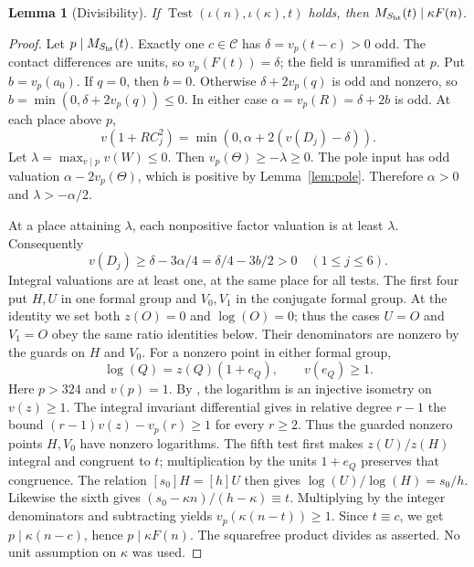 \documentclass[11pt]{article}
\newtheorem{lemma}[theorem]{Lemma}
\theoremstyle{definition}
\theoremstyle{remark}
\newcommand{\Cset}{\mathcal C}
\newcommand{\Test}{\operatorname{Test}}
\begin{document}
\begin{lemma}[Divisibility]\label{lem:test}
If $\Test(\iota(n),\iota(\kappa),t)$ holds, then
$M_{S_{\rm ht}}(t)\mid\kappa F(n)$.
\end{lemma}
\begin{proof}
Let $p\mid M_{S_{\rm ht}}(t)$. Exactly one $c\in\Cset$ has
$\delta=v_p(t-c)>0$ odd. The contact differences are units, so
$v_p(F(t))=\delta$; the field is unramified at $p$. Put $b=v_p(a_0)$.
If $q=0$, then $b=0$. Otherwise $\delta+2v_p(q)$ is odd and
nonzero, so $b=\min(0,\delta+2v_p(q))\le0$. In either case
$\alpha=v_p(R)=\delta+2b$ is odd. At each place above $p$,
\[
 v(1+RC_j^2)=\min(0,\alpha+2(v(D_j)-\delta)).
\]
Let $\lambda=\max_{v\mid p}v(W)\le0$. Then
$v_p(\Theta)\ge-\lambda\ge0$. The pole input has odd valuation
$\alpha-2v_p(\Theta)$, which is positive by Lemma~\ref{lem:pole}.
Therefore $\alpha>0$ and $\lambda> -\alpha/2$.

At a place attaining $\lambda$, each nonpositive factor valuation is
at least $\lambda$. Consequently
\[
 v(D_j)\ge\delta-3\alpha/4=\delta/4-3b/2>0
 \quad(1\le j\le6).
\]
Integral valuations are at least one, at the same place for all tests.
The first four put $H,U$ in one formal group and $V_0,V_1$ in the
conjugate formal group. At the identity we set both $z(O)=0$ and
$\log(O)=0$; thus the cases $U=O$ and $V_1=O$ obey the same ratio
identities below. Their denominators are nonzero by the guards on
$H$ and $V_0$. For a nonzero point in either formal group,
\[
 \log(Q)=z(Q)(1+e_Q),\qquad v(e_Q)\ge1.
\]
Here $p>324$ and $v(p)=1$. By
\cite[IV.5.5 and IV.6.4, pp.~129--132]{silverman},
the logarithm is an injective isometry on $v(z)\ge1$.
The integral invariant differential gives in relative degree $r-1$
the bound $(r-1)v(z)-v_p(r)\ge1$ for every $r\ge2$.
Thus the guarded nonzero points $H,V_0$ have nonzero logarithms.
The fifth test first makes $z(U)/z(H)$ integral and congruent to
$t$; multiplication by the units $1+e_Q$ preserves that congruence.
The relation $[s_0]H=[h]U$ then gives
$\log(U)/\log(H)=s_0/h$. Likewise the sixth gives
$(s_0-\kappa n)/(h-\kappa)\equiv t$.
Multiplying by the integer denominators and subtracting yields
$v_p(\kappa(n-t))\ge1$. Since $t\equiv c$, we get
$p\mid\kappa(n-c)$, hence $p\mid\kappa F(n)$. The squarefree
product divides as asserted. No unit assumption on $\kappa$ was used.
\end{proof}
\end{document}
